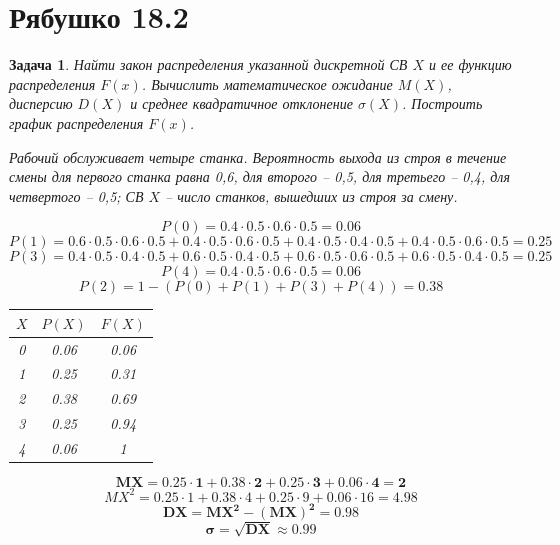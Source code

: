 \documentclass{article}
\theoremstyle{problemstyle}
\newtheorem{problem}{Задача}[section]
\begin{document}
\section{Рябушко 18.2}

\begin{problem}
    Найти закон распределения указанной дискретной СВ $X$
    и ее функцию распределения $F(x)$.
    Вычислить математическое ожидание $M(X)$,
    дисперсию $D(X)$ и среднее квадратичное
    отклонение $\sigma(X)$.
    Построить график распределения $F(x)$.

    Рабочий обслуживает четыре станка.
    Вероятность выхода из строя в течение смены для первого станка равна 0,6,
    для второго – 0,5, для третьего – 0,4, для четвертого – 0,5;
    СВ $ X $ – число станков, вышедших из строя за смену.

    \[ 
        P(0) = 0.4 \cdot 0.5 \cdot 0.6 \cdot 0.5 = 0.06
    \]
    \[ 
        P(1) =
        0.6 \cdot 0.5 \cdot 0.6 \cdot 0.5 +
        0.4 \cdot 0.5 \cdot 0.6 \cdot 0.5 +
        0.4 \cdot 0.5 \cdot 0.4 \cdot 0.5 +
        0.4 \cdot 0.5 \cdot 0.6 \cdot 0.5
        = 0.25
    \]
    \[
        P(3) =
        0.4 \cdot 0.5 \cdot 0.4 \cdot 0.5 +
        0.6 \cdot 0.5 \cdot 0.4 \cdot 0.5 +
        0.6 \cdot 0.5 \cdot 0.6 \cdot 0.5 +
        0.6 \cdot 0.5 \cdot 0.4 \cdot 0.5
        =
        0.25
    \]
    \[
        P(4) = 0.4 \cdot 0.5 \cdot 0.6 \cdot 0.5 = 0.06
    \]
    \[
        P(2) = 1 - (P(0) + P(1) + P(3) + P(4)) = 0.38
    \]

    \begin{table}[ht]
        \centering
        \begin{tabular}{|c|c|c|}
            \hline
            $X$ & $P(X)$ & $F(X)$ \\
            \hline
            0   & 0.06   & 0.06 \\
            \hline
            1   & 0.25   & 0.31 \\
            \hline
            2   & 0.38   & 0.69 \\
            \hline
            3   & 0.25   & 0.94 \\
            \hline
            4   & 0.06   & 1 \\
            \hline
        \end{tabular}
    \end{table}

    \[
        \pmb{MX = 0.25 \cdot 1 + 0.38 \cdot 2 + 0.25 \cdot 3 + 0.06 \cdot 4 = 2}
    \]
    \[
        MX^2 = 0.25 \cdot 1 + 0.38 \cdot 4 + 0.25 \cdot 9 + 0.06 \cdot 16 = 4.98
    \]
    \[
        \pmb{DX = MX^2 - (MX)^2 = 0.98}
    \]
    \[
        \pmb{\sigma = \sqrt{DX} \approx 0.99}
    \]


\end{problem}
\end{document}
